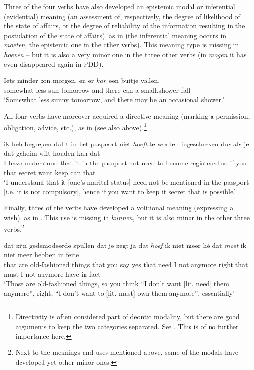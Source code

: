 \documentclass[output=paper]{langsci/langscibook}
\begin{document}
Three of the four verbs have also developed an epistemic modal or inferential (evidential) meaning (an assessment of, respectively, the degree of likelihood of the state of affairs, or the degree of reliability of the information resulting in the postulation of the state of affairs), as in  (the inferential meaning occurs in \textit{moeten}, the epistemic one in the other verbs). This meaning type is missing in \textit{hoeven} – but it is also a very minor one in the three other verbs (in \textit{mogen} it has even disappeared again in PDD).

\ea%
    \label{ex:nuyts:14}
\gll           Iets minder zon morgen, en er \textit{kan} een buitje vallen.\\
  somewhat less sun tomorrow and there can a small.shower fall\\
\glt  `Somewhat less sunny tomorrow, and there may be an occasional shower.'
\z

All four verbs have moreover acquired a directive meaning (marking a permission, obligation, advice, etc.), as in  (see also  above).\footnote{Directivity is often considered part of deontic modality, but there are good arguments to keep the two categories separated. See \citet{NuytsEtAl2010}. This is of no further importance here.}

\ea%
    \label{ex:nuyts:15}
\gll          ik heb begrepen dat {\textquotesingle}t in het paspoort niet \textit{hoeft} te worden ingeschreven dus als je dat geheim wilt houden kan dat\\
  I have understood that it in the passport not need to become registered so if you that secret want keep can that\\
\glt  `I understand that it [one’s marital status] need not be mentioned in the passport [i.e. it is not compulsory], hence if you want to keep it secret that is possible.'
\z

Finally, three of the verbs have developed a volitional meaning (expressing a wish), as in . This use is missing in \textit{kunnen}, but it is also minor in the other three verbs.\footnote{Next to the meanings and uses mentioned above, some of the modals have developed yet other minor ones.}

\ea%
    \label{ex:nuyts:16}
\gll       dat zijn gedemodeerde spullen dat je zegt ja dat \textit{hoef} ik niet meer hé dat \textit{moet} ik niet meer hebben in feite\\
  that are old-fashioned things that you say yes that need I not anymore right that must I not anymore have in fact\\
\glt   `Those are old-fashioned things, so you think ``I don’t want [lit. need] them anymore'', right, ``I don’t want to [lit. must] own them anymore'', essentially.'
\z
\end{document}
